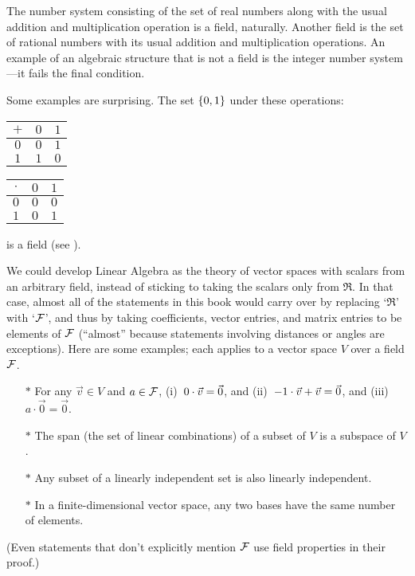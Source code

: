 The number system consisting of the set of real numbers along with the usual
addition and multiplication operation is a field, naturally.
Another field is the set of rational numbers with its usual addition
and multiplication operations.
An example of an algebraic structure that is not a field is
the integer number system---it fails the final condition.

Some examples are surprising.
The set \( \mbox{$\{0,1\}$} \) under these operations:
\begin{center}
  \begin{tabular}{c|cc}
    \( + \) &\( 0 \) &\( 1 \) \\
    \hline
    \( 0 \) &\( 0 \) &\( 1 \) \\
    \( 1 \) &\( 1 \) &\( 0 \)
  \end{tabular}
  \qquad
  \begin{tabular}{c|cc}
    \( \cdot \) &\( 0 \) &\( 1 \) \\
     \hline
       \( 0 \)  &\( 0 \) &\( 0 \)  \\
       \( 1 \)  &\( 0 \) &\( 1 \)
  \end{tabular}
\end{center}
is a field (see ).

We could develop Linear Algebra as the theory of
vector spaces with scalars from an arbitrary field, 
instead of sticking to taking the scalars only from \( \Re \).
In that case, 
almost all of the statements in this book would carry over by replacing
`\( \Re \)' with `\( \mathcal{F} \)', and thus by
taking coefficients, vector entries,
and matrix entries to be elements of \( \mathcal{F} \)
(``almost'' because statements involving distances or angles
are exceptions).
Here are some examples; each applies to a vector space \( V \)
over a field \( \mathcal{F} \).
\begin{itemize}
  \item[$*$] For any \( \vec{v}\in V \) and \( a\in\mathcal{F} \),
  (i)~\( 0\cdot\vec{v}=\vec{0} \),
  and (ii)~\( -1\cdot\vec{v}+\vec{v}=\vec{0} \),
  and (iii)~\( a\cdot\vec{0}=\vec{0} \).

  \item[$*$] The span (the set of linear combinations) of a subset of \( V \)
  is a subspace of \( V \).

  \item[$*$] Any subset of a linearly independent set is also 
     linearly independent.

  \item[$*$] In a finite-dimensional vector space, 
    any two bases have the same number of elements.
\end{itemize}
(Even statements that don't explicitly mention \( \mathcal{F} \) use
field properties in their proof.)

